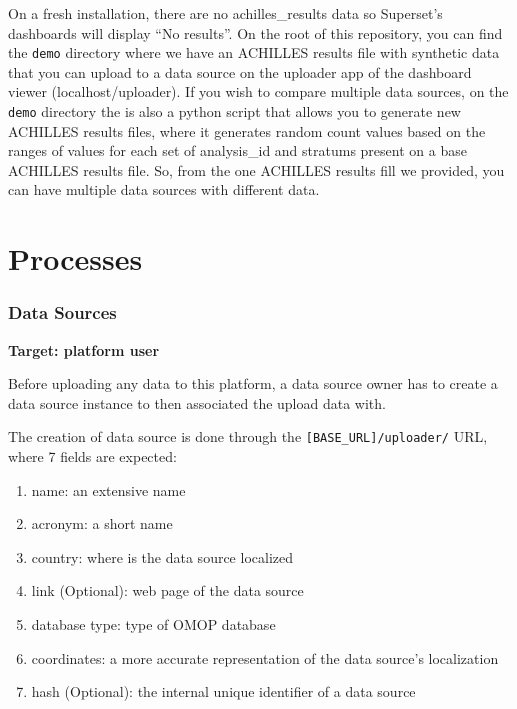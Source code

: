 \documentclass[
]{book}
\providecommand{\tightlist}{%
  \setlength{\itemsep}{0pt}\setlength{\parskip}{0pt}}
\begin{document}
On a fresh installation, there are no achilles\_results data so Superset's dashboards will display ``No results''. On the root of this repository, you can find the \texttt{demo} directory where we have an ACHILLES results file with synthetic data that you can upload to a data source on the uploader app of the dashboard viewer (localhost/uploader). If you wish to compare multiple data sources, on the \texttt{demo} directory the is also a python script that allows you to generate new ACHILLES results files, where it generates random count values based on the ranges of values for each set of analysis\_id and stratums present on a base ACHILLES results file. So, from the one ACHILLES results fill we provided, you can have multiple data sources with different data.

\hypertarget{processes}{%
\chapter{Processes}\label{processes}}

\hypertarget{data-sources}{%
\subsection*{Data Sources}\label{data-sources}}

\textbf{Target: platform user}

Before uploading any data to this platform, a data source owner has to create a data source instance to then associated the upload data with.

The creation of data source is done through the \texttt{{[}BASE\_URL{]}/uploader/} URL, where 7 fields are expected:

\begin{enumerate}
\def\labelenumi{\arabic{enumi}.}
\tightlist
\item
  name: an extensive name
\item
  acronym: a short name
\item
  country: where is the data source localized
\item
  link (Optional): web page of the data source
\item
  database type: type of OMOP database
\item
  coordinates: a more accurate representation of the data source's localization
\item
  hash (Optional): the internal unique identifier of a data source
\end{enumerate}
\end{document}
